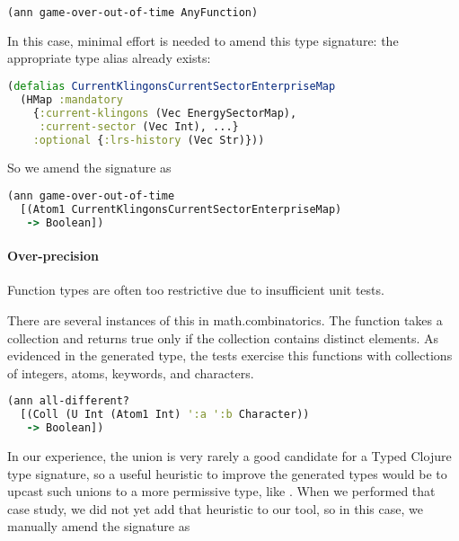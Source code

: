 \begin{lstlisting}[language=Clojure]
(ann game-over-out-of-time AnyFunction)
\end{lstlisting}

In this case, minimal effort is needed to amend this
type signature: the appropriate type alias
already exists:

\begin{lstlisting}[language=Clojure]
(defalias CurrentKlingonsCurrentSectorEnterpriseMap
  (HMap :mandatory
    {:current-klingons (Vec EnergySectorMap),
     :current-sector (Vec Int), ...}
    :optional {:lrs-history (Vec Str)}))
\end{lstlisting}

So we amend the signature as

\begin{lstlisting}[language=Clojure]
(ann game-over-out-of-time
  [(Atom1 CurrentKlingonsCurrentSectorEnterpriseMap) 
   -> Boolean])
\end{lstlisting}


\paragraph{Over-precision}
Function types are often too restrictive due to
insufficient unit tests.

There are several instances of this in math.combinatorics.
The  function
takes a collection and returns true only if the collection
contains distinct elements.
As evidenced in the generated type, the tests exercise
this functions with collections of integers, atoms,
keywords, and characters.

\begin{lstlisting}[language=Clojure]
(ann all-different?
  [(Coll (U Int (Atom1 Int) ':a ':b Character)) 
   -> Boolean])
\end{lstlisting}

In our experience, the union is very rarely a good candidate
for a Typed Clojure type signature, so a useful heuristic to improve
the generated types would be to upcast such unions to a more permissive
type, like .
When we performed that case study, we did not yet add that heuristic
to our tool,
so in this case, we manually amend the signature as

